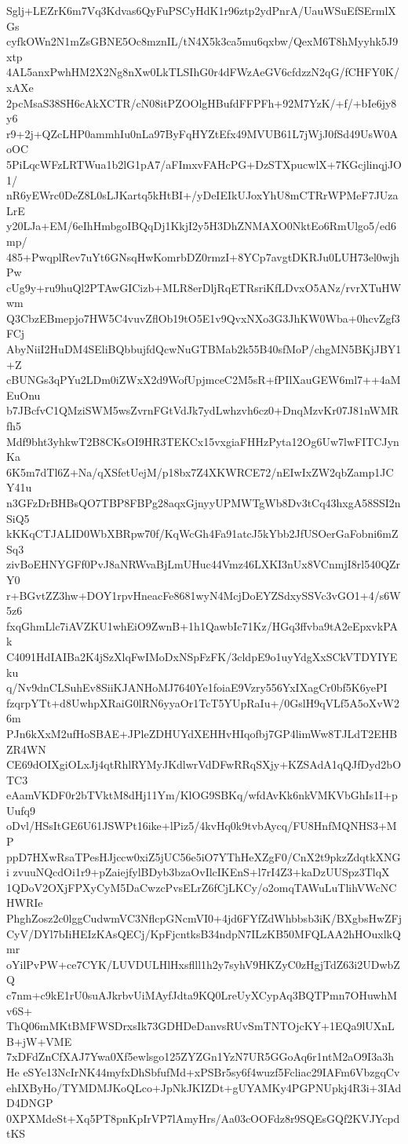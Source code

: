 Sglj+LEZrK6m7Vq3Kdvas6QyFuPSCyHdK1r96ztp2ydPnrA/UauWSuEfSErmlXGs
cyfkOWn2N1mZsGBNE5Oc8mznIL/tN4X5k3ca5mu6qxbw/QexM6T8hMyyhk5J9xtp
4AL5anxPwhHM2X2Ng8nXw0LkTLSIhG0r4dFWzAeGV6cfdzzN2qG/fCHFY0K/xAXe
2pcMsaS38SH6cAkXCTR/cN08itPZOOlgHBufdFFPFh+92M7YzK/+f/+bIe6jy8y6
r9+2j+QZcLHP0ammhIu0nLa97ByFqHYZtEfx49MVUB61L7jWjJ0fSd49UsW0AoOC
5PiLqcWFzLRTWua1b2lG1pA7/aFImxvFAHcPG+DzSTXpucwlX+7KGcjlinqjJO1/
nR6yEWrc0DeZ8L0sLJKartq5kHtBI+/yDeIEIkUJoxYhU8mCTRrWPMeF7JUzaLrE
y20LJa+EM/6eIhHmbgoIBQqDj1KkjI2y5H3DhZNMAXO0NktEo6RmUlgo5/ed6mp/
485+PwqplRev7uYt6GNsqHwKomrbDZ0rmzI+8YCp7avgtDKRJu0LUH73el0wjhPw
cUg9y+ru9huQl2PTAwGICizb+MLR8erDljRqETRsriKfLDvxO5ANz/rvrXTuHWwm
Q3CbzEBmepjo7HW5C4vuvZflOb19tO5E1v9QvxNXo3G3JhKW0Wba+0hcvZgf3FCj
AbyNiiI2HuDM4SEliBQbbujfdQcwNuGTBMab2k55B40sfMoP/chgMN5BKjJBY1+Z
cBUNGs3qPYu2LDm0iZWxX2d9WofUpjmceC2M5sR+fPIlXauGEW6ml7++4aMEuOnu
b7JBcfvC1QMziSWM5wsZvrnFGtVdJk7ydLwhzvh6cz0+DnqMzvKr07J81nWMRfh5
Mdf9bht3yhkwT2B8CKsOI9HR3TEKCx15vxgiaFHHzPyta12Og6Uw7lwFITCJynKa
6K5m7dTl6Z+Na/qXSfetUejM/p18bx7Z4XKWRCE72/nEIwIxZW2qbZamp1JCY41u
n3GFzDrBHBsQO7TBP8FBPg28aqxGjnyyUPMWTgWb8Dv3tCq43hxgA58SSI2nSiQ5
kKKqCTJALID0WbXBRpw70f/KqWcGh4Fa91atcJ5kYbb2JfUSOerGaFobni6mZSq3
zivBoEHNYGFf0PvJ8aNRWvaBjLmUHuc44Vmz46LXKI3nUx8VCnmjI8rl540QZrY0
r+BGvtZZ3hw+DOY1rpvHneacFe8681wyN4McjDoEYZSdxySSVc3vGO1+4/s6W5z6
fxqGhmLlc7iAVZKU1whEiO9ZwnB+1h1QawbIc71Kz/HGq3ffvba9tA2eEpxvkPAk
C4091HdIAIBa2K4jSzXlqFwIMoDxNSpFzFK/3cldpE9o1uyYdgXxSCkVTDYIYEku
q/Nv9dnCLSuhEv8SiiKJANHoMJ7640Ye1foiaE9Vzry556YxIXagCr0bf5K6yePI
fzqrpYTt+d8UwhpXRaiG0lRN6yyaOr1TcT5YUpRaIu+/0GslH9qVLf5A5oXvW26m
PJn6kXxM2ufHoSBAE+JPleZDHUYdXEHHvHIqofbj7GP4limWw8TJLdT2EHBZR4WN
CE69dOIXgiOLxJj4qtRhlRYMyJKdlwrVdDFwRRqSXjy+KZSAdA1qQJfDyd2bOTC3
eAamVKDF0r2bTVktM8dHj11Ym/KlOG9SBKq/wfdAvKk6nkVMKVbGhIs1I+pUufq9
oDvl/HSsItGE6U61JSWPt16ike+lPiz5/4kvHq0k9tvbAycq/FU8HnfMQNHS3+MP
ppD7HXwRsaTPesHJjccw0xiZ5jUC56e5iO7YThHeXZgF0/CnX2t9pkzZdqtkXNGi
zvuuNQcdOi1r9+pZaiejfylBDyb3bzaOvIlcIKEnS+l7rI4Z3+kaDzUUSpz3TlqX
1QDoV2OXjFPXyCyM5DaCwzcPvsELrZ6fCjLKCy/o2omqTAWuLuTlihVWcNCHWRIe
PhghZosz2c0lggCudwmVC3NflcpGNcmVI0+4jd6FYfZdWhbbsb3iK/BXgbsHwZFj
CyV/DYl7bIiHEIzKAsQECj/KpFjcntksB34ndpN7ILzKB50MFQLAA2hHOuxlkQmr
oYilPvPW+ce7CYK/LUVDULHlHxsflll1h2y7syhV9HKZyC0zHgjTdZ63i2UDwbZQ
c7nm+c9kE1rU0suAJkrbvUiMAyfJdta9KQ0LreUyXCypAq3BQTPmn7OHuwhMv6S+
ThQ06mMKtBMFWSDrxsIk73GDHDeDanvsRUvSmTNTOjcKY+1EQa9lUXnLB+jW+VME
7xDFdZnCfXAJ7Ywa0Xf5ewlsgo125ZYZGn1YzN7UR5GGoAq6r1ntM2aO9I3a3hHe
eSYe13NcIrNK44myfxDhSbfufMd+xPSBr5sy6f4wuzf5Fcliac29IAFm6VbzgqCv
ehIXByHo/TYMDMJKoQLco+JpNkJKIZDt+gUYAMKy4PGPNUpkj4R3i+3IAdD4DNGP
0XPXMdeSt+Xq5PT8pnKpIrVP7lAmyHrs/Aa03cOOFdz8r9SQEsGQf2KVJYcpdtKS

